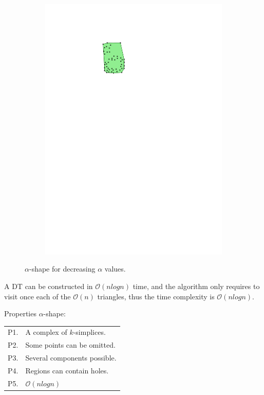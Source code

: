 \begin{figure}
\begin{subfigure}[b]{0.15\linewidth}
    \includegraphics[page=5,width=\textwidth]{figs/alphashape.pdf}
    \caption{}\label{fig:aplhashape:e}
  \end{subfigure}
  \qquad 
\caption{$\alpha$-shape for decreasing $\alpha$ values.}
\label{fig:alphashape}
\end{figure}

%

A DT can be constructed in $\mathcal{O}(n log n)$ time, and the algorithm only requires to visit once each of the $\mathcal{O}(n)$ triangles, thus the time complexity is $\mathcal{O}(n log n)$.

%

Properties $\alpha$-shape:
\\
\begin{tabular}{@{}ll@{}}
\toprule
  P1. & A complex of $k$-simplices.  \\  
  P2. & Some points can be omitted. \\ 
  P3. & Several components possible.  \\ 
  P4. & Regions can contain holes.  \\  
  P5. & $\mathcal{O}(n log n)$  \\ 
\bottomrule
\end{tabular}



